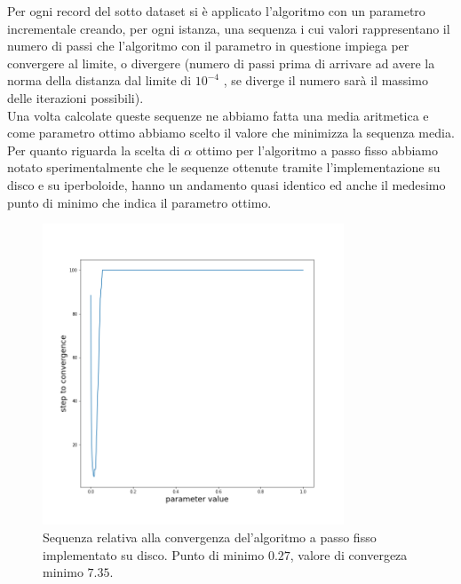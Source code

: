 \documentclass[a4paper, 12pt]{article}
\begin{document}
Per ogni record del sotto dataset si è applicato l'algoritmo con un parametro incrementale creando, per ogni istanza, una sequenza i cui valori rappresentano il numero di passi che l'algoritmo con il parametro in questione impiega per convergere al limite, o divergere (numero di passi prima di arrivare ad avere la norma della distanza dal limite di $10^{-4}$ , se diverge il numero sarà il massimo delle iterazioni possibili).\\
Una volta calcolate queste sequenze ne abbiamo fatta una media aritmetica e come parametro ottimo abbiamo scelto il valore che minimizza la sequenza media.\\
Per quanto riguarda la scelta di $\alpha$ ottimo per l'algoritmo a passo fisso abbiamo notato sperimentalmente che le sequenze ottenute tramite l'implementazione su disco e su iperboloide, hanno un andamento quasi identico ed anche il medesimo punto di minimo che indica il parametro ottimo.\\
\begin{figure}[H] %
    \centering\includegraphics[width=0.8\textwidth]{fixed_step_parameter_poincare.png}
    \caption{Sequenza relativa alla convergenza del'algoritmo a passo fisso implementato su disco. Punto di minimo $0.27$, valore di convergeza minimo $7.35$.}
\end{figure}
\end{document}
